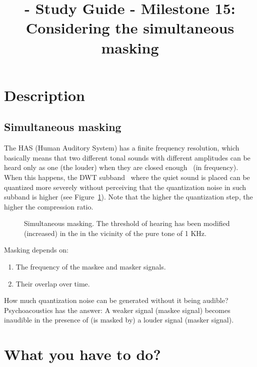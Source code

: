 

\title{\TM{} - Study Guide - Milestone 15: Considering the simultaneous masking}

\maketitle

\section{Description}

\subsection{Simultaneous masking}
The HAS (Human Auditory System) has a finite frequency resolution,
which basically means that two different tonal sounds with different
amplitudes can be heard only as one (the louder) when they are
closed enough~\cite{bosi2003intro} (in frequency). When this happens,
the DWT subband~\cite{vetterli1995wavelets} where the quiet sound is
placed can be quantized more severely without perceiving that the
quantization noise in such subband is higher (see
Figure~\ref{fig:SM}). Note that the higher the quantization step,
the higher the compression ratio.

\begin{figure}
  \centering
  \caption{Simultaneous masking. The threshold of hearing has been modified (increased) in the in the vicinity of the pure tone of 1 KHz.}
  \label{fig:SM}
\end{figure}

Masking depends on:
\begin{enumerate}
\item The frequency of the maskee and masker signals.
\item Their overlap over time.
\end{enumerate}

How much quantization noise can be generated without it being audible?
Psychoacoustics has the answer: A weaker signal (maskee signal) becomes
inaudible in the presence of (is masked by) a louder signal (masker signal). 

\section{What you have to do?}

